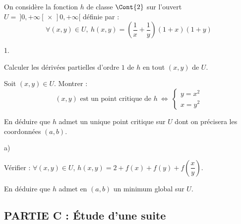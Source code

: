 \documentclass[11pt]{article}%
\begin{document}
\noindent %
On considère la fonction $h$ de classe $\Cont{2}$ sur l'ouvert $U = \
]0,+\infty[ \, \times \, ]0,+\infty[$ définie par :
\[
  \forall (x,y) \in U, \ h(x,y) = \left(\dfrac{1}{x} +
    \dfrac{1}{y}\right) (1+x) (1+y)
\]
\begin{noliste}{1.}
  \setlength{\itemsep}{4mm}
  \setcounter{enumi}{3}
\item Calculer les dérivées partielles d'ordre $1$ de $h$ en tout
  $(x,y)$ de $U$.
  
\item Soit $(x,y) \in U$. Montrer :
  \[
    \text{$(x,y)$ est un point critique de $h$} \ \Leftrightarrow \
    \left\{
      \begin{array}{l}
        y = x^2\\
        x = y^2
      \end{array}
    \right.
   \]
    
\item En déduire que $h$ admet un unique point critique sur $U$ dont
  on précisera les coordonnées $(a,b)$.
  
\item
  \begin{noliste}{a)}
    \setlength{\itemsep}{2mm}
  \item Vérifier : $\forall (x,y) \in U$, $h(x,y) = 2+ f(x) + f(y) +
    f\left( \dfrac{x}{y} \right)$.
    
  \item En déduire que $h$ admet en $(a,b)$ un minimum global sur $U$.
  \end{noliste}
\end{noliste}


\subsection*{PARTIE C : \'Etude d'une suite} %
\end{document}
